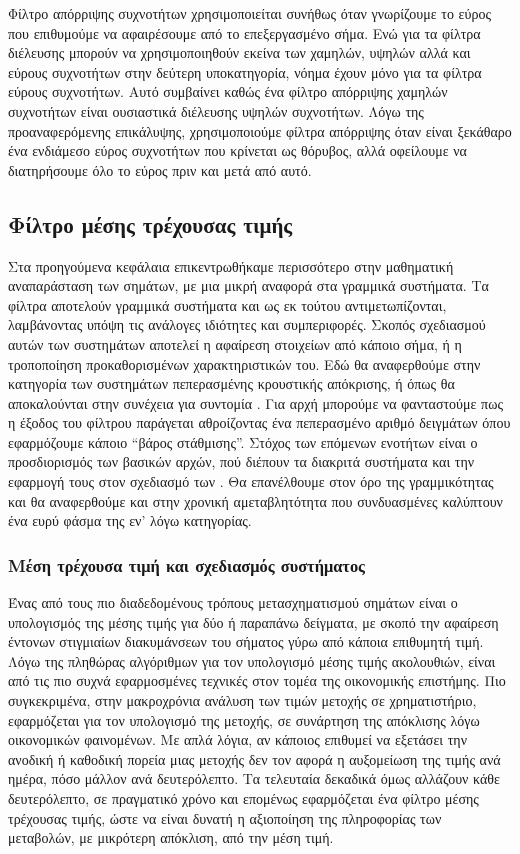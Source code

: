 \documentclass[11pt]{article}
\newcommand{\en}[1]{\selectlanguage{english}\text{#1}\selectlanguage{greek}}
\begin{document}
Φίλτρο απόρριψης συχνοτήτων χρησιμοποιείται συνήθως όταν γνωρίζουμε το εύρος
που επιθυμούμε να αφαιρέσουμε από το επεξεργασμένο σήμα. Ενώ για τα φίλτρα
διέλευσης μπορούν να χρησιμοποιηθούν εκείνα των χαμηλών, υψηλών αλλά και
εύρους συχνοτήτων στην δεύτερη υποκατηγορία, νόημα έχουν μόνο για τα φίλτρα
εύρους συχνοτήτων.
Αυτό συμβαίνει καθώς ένα φίλτρο απόρριψης χαμηλών συχνοτήτων είναι ουσιαστικά
διέλευσης υψηλών συχνοτήτων. Λόγω της προαναφερόμενης επικάλυψης, χρησιμοποιούμε
φίλτρα απόρριψης όταν είναι ξεκάθαρο ένα ενδιάμεσο εύρος συχνοτήτων που κρίνεται
ως θόρυβος, αλλά οφείλουμε να διατηρήσουμε όλο το εύρος πριν και μετά από αυτό.
\subsection{Φίλτρο μέσης τρέχουσας τιμής}
\label{sec:org7db3aa7}
Στα προηγούμενα κεφάλαια επικεντρωθήκαμε περισσότερο στην μαθηματική αναπαράσταση
των σημάτων, με μια μικρή αναφορά στα γραμμικά συστήματα. Τα φίλτρα αποτελούν γραμμικά
συστήματα και ως εκ τούτου αντιμετωπίζονται, λαμβάνοντας υπόψη τις ανάλογες ιδιότητες
και συμπεριφορές. Σκοπός σχεδιασμού αυτών των συστημάτων αποτελεί η αφαίρεση στοιχείων
από κάποιο σήμα, ή η τροποποίηση προκαθορισμένων χαρακτηριστικών του. Εδώ θα αναφερθούμε
στην κατηγορία των συστημάτων πεπερασμένης κρουστικής απόκρισης, ή όπως θα αποκαλούνται
στην συνέχεια για συντομία \en{F.I.R.}. Για αρχή μπορούμε να φανταστούμε πως η έξοδος του
φίλτρου παράγεται αθροίζοντας ένα πεπερασμένο αριθμό δειγμάτων όπου εφαρμόζουμε κάποιο
“βάρος στάθμισης”. Στόχος των επόμενων ενοτήτων είναι ο προσδιορισμός των βασικών αρχών,
πού διέπουν τα διακριτά συστήματα και την εφαρμογή τους στον σχεδιασμό των \en{F.I.R.}. Θα
επανέλθουμε στον όρο της γραμμικότητας και θα αναφερθούμε και στην χρονική αμεταβλητότητα
που συνδυασμένες καλύπτουν ένα ευρύ φάσμα της εν' λόγω κατηγορίας.
\subsubsection{Μέση τρέχουσα τιμή και σχεδιασμός συστήματος}
\label{sec:org6e561ec}
Ένας από τους πιο διαδεδομένους τρόπους μετασχηματισμού σημάτων είναι ο υπολογισμός
της μέσης τιμής για δύο ή παραπάνω δείγματα, με σκοπό την αφαίρεση έντονων στιγμιαίων
διακυμάνσεων του σήματος γύρω από κάποια επιθυμητή τιμή. Λόγω της πληθώρας αλγόριθμων
για τον υπολογισμό μέσης τιμής ακολουθιών, είναι από τις πιο συχνά εφαρμοσμένες τεχνικές
στον τομέα της οικονομικής επιστήμης. Πιο συγκεκριμένα, στην μακροχρόνια ανάλυση των
τιμών μετοχής σε χρηματιστήριο, εφαρμόζεται για τον υπολογισμό της μετοχής, σε συνάρτηση
της απόκλισης λόγω οικονομικών φαινομένων. Με απλά λόγια, αν κάποιος επιθυμεί να εξετάσει
την ανοδική ή καθοδική πορεία μιας μετοχής δεν τον αφορά η αυξομείωση της τιμής ανά ημέρα,
πόσο μάλλον ανά δευτερόλεπτο. Τα τελευταία δεκαδικά όμως αλλάζουν κάθε δευτερόλεπτο, σε
πραγματικό χρόνο και επομένως εφαρμόζεται ένα φίλτρο μέσης τρέχουσας τιμής,
ώστε να είναι δυνατή η αξιοποίηση της πληροφορίας των μεταβολών, με μικρότερη απόκλιση,
από την μέση τιμή.
\end{document}
